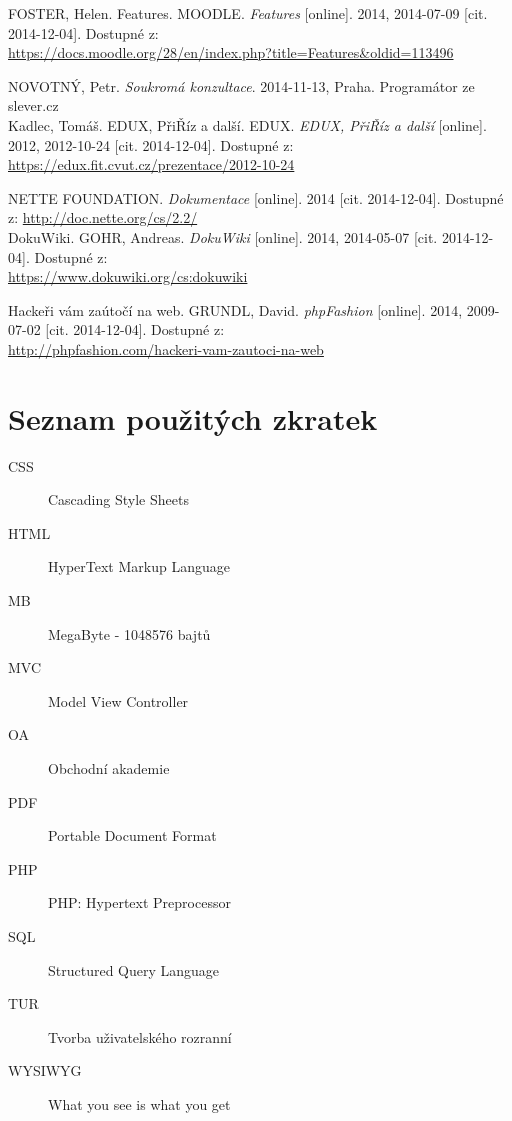 \documentclass[thesis=B,czech]{FITthesis}[2012/06/26]
\begin{document}

\begin{thebibliography}{9}

FOSTER, Helen. Features. MOODLE. \textit{Features} [online]. 2014, 2014-07-09 [cit. 2014-12-04]. Dostupné z:\\ \url{https://docs.moodle.org/28/en/index.php?title=Features&oldid=113496}

	NOVOTNÝ, Petr. \emph{Soukromá konzultace}. 2014-11-13, Praha. Programátor ze slever.cz\\

	Kadlec, Tomáš. EDUX, PřiŘíz a další. EDUX. \textit{EDUX, PřiŘíz a další} [online]. 2012, 2012-10-24 [cit. 2014-12-04]. Dostupné z:\\ 
	\url{https://edux.fit.cvut.cz/prezentace/2012-10-24}
	
	NETTE FOUNDATION. \textit{Dokumentace} [online]. 2014 [cit. 2014-12-04]. Dostupné z:
	\url{http://doc.nette.org/cs/2.2/}\\

DokuWiki. GOHR, Andreas. \textit{DokuWiki} [online]. 2014, 2014-05-07 [cit. 2014-12-04]. Dostupné z: \\
\url{https://www.dokuwiki.org/cs:dokuwiki}

Hackeři vám zaútočí na web. GRUNDL, David. \textit{phpFashion} [online]. 2014, 2009-07-02 [cit. 2014-12-04]. Dostupné z:\\
\url{http://phpfashion.com/hackeri-vam-zautoci-na-web}

\end{thebibliography}


\appendix

\chapter{Seznam použitých zkratek}
\begin{description}
	\item[CSS] Cascading Style Sheets
	\item[HTML] HyperText Markup Language
	\item[MB] MegaByte - 1048576 bajtů
	\item[MVC] Model View Controller
	\item[OA] Obchodní akademie
	\item[PDF] Portable Document Format
	\item[PHP] PHP: Hypertext Preprocessor
	\item[SQL] Structured Query Language
	\item[TUR] Tvorba uživatelského rozranní
	\item[WYSIWYG] What you see is what you get
\end{description}
\end{document}

